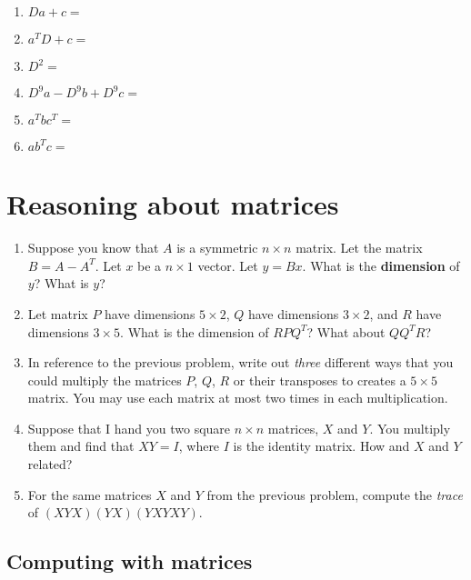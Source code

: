 \documentclass[11pt,onecolumn,superscriptaddress,notitlepage]{article}
\begin{document}
\begin{enumerate}[resume]
	\item $Da + c =$
	\item $a^{T}D + c = $
	\item $D^2=$
	\item $D^9 a - D^9b + D^9c = $
	\item $a^T b c^T = $
	\item $a b^T c = $
\end{enumerate}

\clearpage
\section*{Reasoning about matrices} 

\begin{enumerate}[resume]
	\item Suppose you know that $A$ is a symmetric $n \times n$ matrix. Let the matrix $B = A-A^{T}$. Let $x$ be a $n \times 1$ vector. Let $y=Bx$.  What is the {\bf dimension} of $y$? What is $y$?
	\item Let matrix $P$ have dimensions $5 \times 2$, $Q$ have dimensions $3 \times 2$, and $R$ have dimensions $3 \times 5$.  What is the dimension of $RPQ^{T}$? What about $QQ^{T}R$?
	\item In reference to the previous problem, write out {\it three} different ways that you could multiply the matrices $P$, $Q$, $R$ or their transposes to creates a $5 \times 5$ matrix. You may use each matrix at most two times in each multiplication.
	\item Suppose that I hand you two square $n\times n$ matrices, $X$ and $Y$. You multiply them and find that $XY=I$, where $I$ is the identity matrix. How and $X$ and $Y$ related?
	\item For the same matrices $X$ and $Y$ from the previous problem, compute the {\it trace} of $(XYX)(YX)(YXYXY)$.
\end{enumerate}

\clearpage
\subsection*{Computing with matrices}
\end{document}
